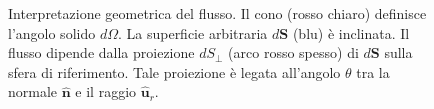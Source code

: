 \documentclass[a4paper,11pt]{report}
\begin{document}
\begin{figure}[H]
\caption{Interpretazione geometrica del flusso. Il cono (rosso chiaro) definisce l'angolo solido $d\Omega$. La superficie arbitraria $d\bm{S}$ (blu) è inclinata. Il flusso dipende dalla proiezione $dS_\perp$ (arco rosso spesso) di $d\bm{S}$ sulla sfera di riferimento. Tale proiezione è legata all'angolo $\theta$ tra la normale $\hat{\bm{n}}$ e il raggio $\hat{\bm{u}}_r$.}
\label{fig:flusso_angolo_solido_v2}
\end{figure}
\end{document}
